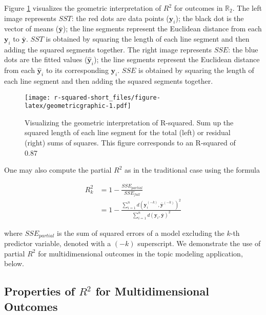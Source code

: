 Figure \ref{fig:geometricgraphic} visualizes the geometric interpretation of \(R^2\) for outcomes in \(\mathbb{R}_2\). The left image represents \(SST\): the red dots are data points (\(\boldsymbol{y}_i\)); the black dot is the vector of means (\(\bar{\boldsymbol{y}}\)); the line segments represent the Euclidean distance from each \(\boldsymbol{y}_i\) to \(\bar{\boldsymbol{y}}\). \(SST\) is obtained by squaring the length of each line segment and then adding the squared segments together. The right image represents \(SSE\): the blue dots are the fitted values (\(\hat{\boldsymbol{y}}_i\)); the line segments represent the Euclidean distance from each \(\hat{\boldsymbol{y}}_i\) to its corresponding \(\boldsymbol{y}_i\). \(SSE\) is obtained by squaring the length of each line segment and then adding the squared segments together.

\begin{figure}
\centering
\texttt{[image: r-squared-short\_files/figure-latex/geometricgraphic-1.pdf]}
\caption{\label{fig:geometricgraphic}Visualizing the geometric interpretation of R-squared. Sum up the squared length of each line segment for the total (left) or residual (right) sums of squares. This figure corresponds to an R-squared of 0.87}
\end{figure}

One may also compute the partial \(R^2\) as in the traditional case using the formula

\begin{align}
    R^2_{k} &= 1 - \frac{SSE_{partial}}{SSE_{full}}\\
        &= 1 - \frac{\sum_{i=1}^n d(\boldsymbol{y}_i^{(-k)},\bar{\boldsymbol{y}}^{(-k)})^2}{\sum_{i=1}^n d(\boldsymbol{y}_i,\bar{\boldsymbol{y}})^2}
\end{align}

where \(SSE_{partial}\) is the sum of squared errors of a model excluding the \(k\)-th predictor variable, denoted with a \((-k)\) superscript. We demonstrate the use of partial \(R^2\) for multidimensional outcomes in the topic modeling application, below.

\hypertarget{properties-of-r2-for-multidimensional-outcomes}{%
\subsection{\texorpdfstring{Properties of \(R^2\) for Multidimensional Outcomes}{Properties of R\^{}2 for Multidimensional Outcomes}}\label{properties-of-r2-for-multidimensional-outcomes}}

